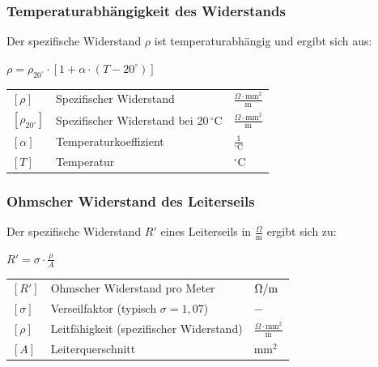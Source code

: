 \subsubsection{Temperaturabhängigkeit des Widerstands}

Der spezifische Widerstand $\rho$ ist temperaturabhängig und ergibt sich aus:

\vspace{0.15cm}

$
\boxed{
\rho = \rho_{20^\circ} \cdot \left[ 1 + \alpha \cdot (T - 20^\circ) \right]
}
$

\vspace{0.15cm}

\renewcommand{\arraystretch}{1.2}
\begin{tabular}{@{} l p{6cm} l @{}}
    $[\rho]$              & Spezifischer Widerstand \dotfill & $\frac{\Omega \cdot \text{mm}^2}{\text{m}}$ \\
    $[\rho_{20^\circ}]$   & Spezifischer Widerstand bei $20\,^\circ$C \dotfill & $\frac{\Omega \cdot \text{mm}^2}{\text{m}}$ \\
    $[\alpha]$            & Temperaturkoeffizient \dotfill & $\frac{1}{\text{$^\circ$C}}$ \\
    $[T]$            & Temperatur \dotfill & $^\circ$C \\
\end{tabular}


\subsubsection{Ohmscher Widerstand des Leiterseils}

Der spezifische Widerstand $R'$ eines Leiterseils in $\frac{\Omega}{\text{m}}$ ergibt sich zu:

\vspace{0.15cm}

$
\boxed{
R' = \sigma \cdot \frac{\rho}{A}
}
$

\vspace{0.15cm}

\renewcommand{\arraystretch}{1.2}
\begin{tabular}{@{} l p{6cm} l @{}}
    $[R']$      & Ohmscher Widerstand pro Meter \dotfill & $\Omega/\text{\text{m}}$ \\
    $[\sigma]$  & Verseilfaktor (typisch $\sigma = 1{,}07$) \dotfill & $-$ \\
    $[\rho]$    & Leitfähigkeit (spezifischer Widerstand) \dotfill & $\frac{\Omega \cdot \text{mm}^2}{\text{m}}$ \\
    $[A]$       & Leiterquerschnitt \dotfill & $\text{mm}^2$ \\
\end{tabular}



